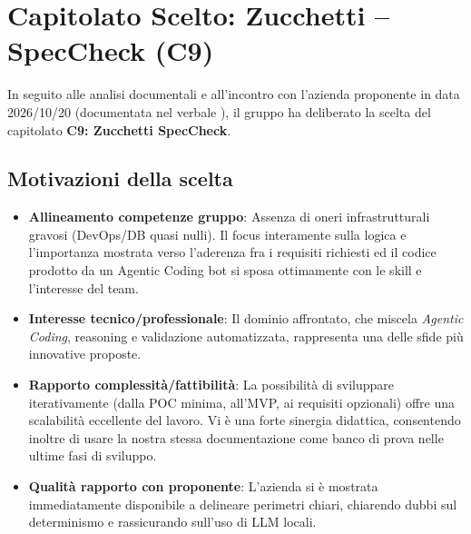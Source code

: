 \documentclass[a4paper, 11pt]{article}
\begin{document}
\section{Capitolato Scelto: Zucchetti -- SpecCheck (C9)}

In seguito alle analisi documentali e all'incontro con l'azienda proponente in data 2026/10/20 (documentata nel verbale ), il gruppo ha deliberato la scelta del capitolato \textbf{C9: Zucchetti SpecCheck}.

\subsection{Motivazioni della scelta}
\begin{itemize}[label=-]
    \item \textbf{Allineamento competenze gruppo}: Assenza di oneri infrastrutturali gravosi (DevOps/DB quasi nulli). Il focus interamente sulla logica e l'importanza mostrata verso l'aderenza fra i requisiti richiesti ed il codice prodotto da un Agentic Coding bot si sposa ottimamente con le skill e l'interesse del team.
    \item \textbf{Interesse tecnico/professionale}: Il dominio affrontato, che miscela \textit{Agentic Coding}, reasoning e validazione automatizzata, rappresenta una delle sfide più innovative proposte.
    \item \textbf{Rapporto complessità/fattibilità}: La possibilità di sviluppare iterativamente (dalla POC minima, all'MVP, ai requisiti opzionali) offre una scalabilità eccellente del lavoro. Vi è una forte sinergia didattica, consentendo inoltre di usare la nostra stessa documentazione come banco di prova nelle ultime fasi di sviluppo.
    \item \textbf{Qualità rapporto con proponente}: L'azienda si è mostrata immediatamente disponibile a delineare perimetri chiari, chiarendo dubbi sul determinismo e rassicurando sull'uso di LLM locali.
\end{itemize}
\end{document}
